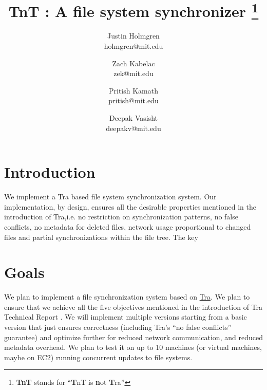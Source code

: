 



\title{TnT : A file system synchronizer \footnote{{\bf TnT} stands for ``{\bf T}nT is {\bf n}ot {\bf T}ra''}}
\author{
Justin Holmgren \\ \normalsize holmgren@mit.edu \and
Zach Kabelac \\ \normalsize zek@mit.edu \and
Pritish Kamath \\ \normalsize pritish@mit.edu\and
Deepak Vasisht \\ \normalsize deepakv@mit.edu
}

\maketitle


\section {Introduction}
We implement a Tra based file system synchronization system. Our implementation, by design, ensures all the desirable properties mentioned in the introduction of Tra,i.e. no restriction on synchronization patterns, no false conflicts, no metadata for deleted files, network usage proportional to changed files and partial synchronizations within the file tree. The key 

\section{Goals}
We plan to implement a file synchronization system based on \href{http://swtch.com/tra/}{Tra}. We plan to ensure that we achieve all the five objectives mentioned in the introduction of Tra Technical Report \cite{tra-tech-report}. We will implement multiple versions starting from a basic version that just ensures correctness (including Tra's ``no false conflicts'' guarantee) and optimize further for reduced network communication, and reduced metadata overhead. We plan to test it on up to 10 machines (or virtual machines, maybe on EC2) running concurrent updates to file systems.

